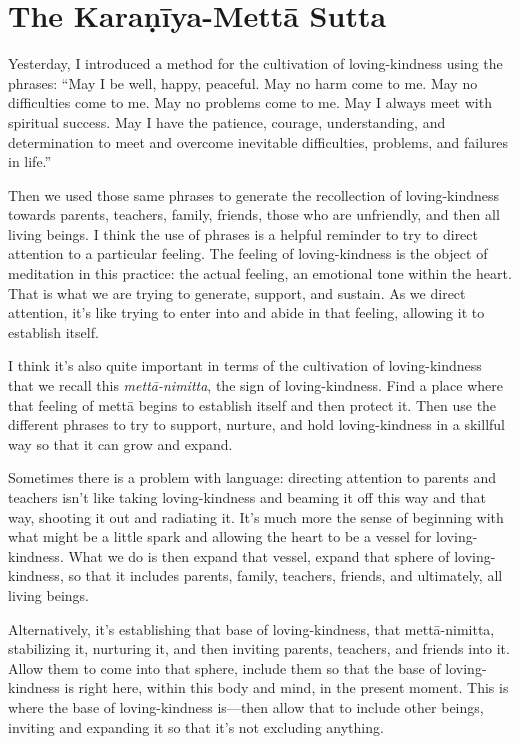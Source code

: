 \chapter{The Karaṇīya-Mettā
Sutta}

Yesterday, I introduced a method for the cultivation of loving-kindness
using the phrases: “May I be well, happy, peaceful. May no harm come to
me. May no difficulties come to me. May no problems come to me. May I
always meet with spiritual success. May I have the patience, courage,
understanding, and determination to meet and overcome inevitable
difficulties, problems, and failures in life.”

Then we used those same phrases to generate the recollection of
loving-kindness towards parents, teachers, family, friends, those who
are unfriendly, and then all living beings. I think the use of phrases
is a helpful reminder to try to direct attention to a particular
feeling. The feeling of loving-kindness is the object of meditation in
this practice: the actual feeling, an emotional tone within the heart.
That is what we are trying to generate, support, and sustain. As we
direct attention, it’s like trying to enter into and abide in that
feeling, allowing it to establish itself.

I think it’s also quite important in terms of the cultivation of
loving-kindness that we recall this \emph{mettā-nimitta}, the sign of
loving-kindness. Find a place where that feeling of mettā begins to
establish itself and then protect it. Then use the different phrases to
try to support, nurture, and hold loving-kindness in a skillful way so
that it can grow and expand.

Sometimes there is a problem with language: directing attention to
parents and teachers isn’t like taking loving-kindness and beaming it
off this way and that way, shooting it out and radiating it. It’s much
more the sense of beginning with what might be a little spark and
allowing the heart to be a vessel for loving-kindness. What we do is
then expand that vessel, expand that sphere of loving-kindness, so that
it includes parents, family, teachers, friends, and ultimately, all
living beings.

Alternatively, it’s establishing that base of loving-kindness, that
mettā-nimitta, stabilizing it, nurturing it, and then inviting parents,
teachers, and friends into it. Allow them to come into that sphere,
include them so that the base of loving-kindness is right here, within
this body and mind, in the present moment. This is where the base of
loving-kindness is—then allow that to include other beings, inviting and
expanding it so that it’s not excluding anything.

